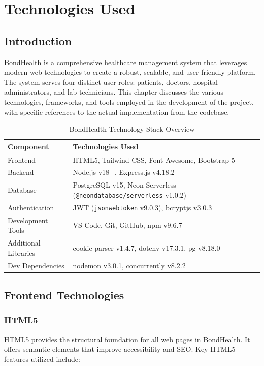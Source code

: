\chapter{Technologies Used}

\section{Introduction}
BondHealth is a comprehensive healthcare management system that leverages modern web technologies to create a robust, scalable, and user-friendly platform. The system serves four distinct user roles: patients, doctors, hospital administrators, and lab technicians. This chapter discusses the various technologies, frameworks, and tools employed in the development of the project, with specific references to the actual implementation from the codebase.

\begin{table}[H]
    \centering
    \begin{tabular}{|l|p{10cm}|}
        \hline
        \textbf{Component} & \textbf{Technologies Used} \\
        \hline
        Frontend & HTML5, Tailwind CSS, Font Awesome, Bootstrap 5 \\
        \hline
        Backend & Node.js v18+, Express.js v4.18.2 \\
        \hline
        Database & PostgreSQL v15, Neon Serverless (\texttt{@neondatabase/serverless} v1.0.2) \\
        \hline
        Authentication & JWT (\texttt{jsonwebtoken} v9.0.3), bcryptjs v3.0.3 \\
        \hline
        Development Tools & VS Code, Git, GitHub, npm v9.6.7 \\
        \hline
        Additional Libraries & cookie-parser v1.4.7, dotenv v17.3.1, pg v8.18.0 \\
        \hline
        Dev Dependencies & nodemon v3.0.1, concurrently v8.2.2 \\
        \hline
    \end{tabular}
    \caption{BondHealth Technology Stack Overview}
    \label{tab:tech-stack}
\end{table}

\section{Frontend Technologies}

\subsection{HTML5}
HTML5 provides the structural foundation for all web pages in BondHealth. It offers semantic elements that improve accessibility and SEO. Key HTML5 features utilized include:

